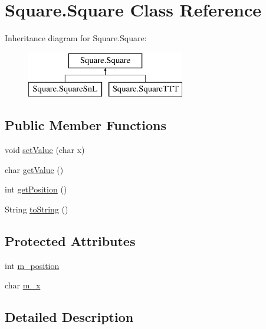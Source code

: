 \hypertarget{class_square_1_1_square}{}\section{Square.\+Square Class Reference}
\label{class_square_1_1_square}
Inheritance diagram for Square.\+Square\+:\begin{figure}[H]
\begin{center}
\leavevmode
\includegraphics[height=2.000000cm]{class_square_1_1_square}
\end{center}
\end{figure}
\subsection*{Public Member Functions}
\begin{DoxyCompactItemize}
\item 
void \hyperlink{class_square_1_1_square_a660b369288339117bda29e9a47dae8f6}{set\+Value} (char x)
\item 
char \hyperlink{class_square_1_1_square_a0afb61e6814c61ae2036b15a1a958e6f}{get\+Value} ()
\item 
int \hyperlink{class_square_1_1_square_a270f9a35b0432406d2464201ece4c6b0}{get\+Position} ()
\item 
String \hyperlink{class_square_1_1_square_ab94a6f61d25fde4e49055fcb09d6f33a}{to\+String} ()
\end{DoxyCompactItemize}
\subsection*{Protected Attributes}
\begin{DoxyCompactItemize}
\item 
int \hyperlink{class_square_1_1_square_a459ef3208bfff1bc1a693a335c2cd5e5}{m\+\_\+position}
\item 
char \hyperlink{class_square_1_1_square_a9e0779af7f8cbe54b28f95bb4a5d165a}{m\+\_\+x}
\end{DoxyCompactItemize}


\subsection{Detailed Description}


